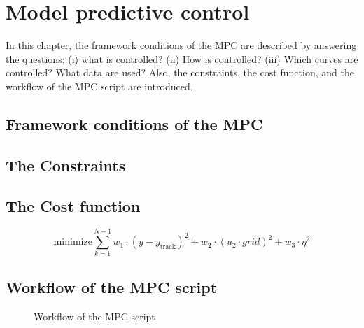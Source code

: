 \chapter{Model predictive control}
\label{ch:mpc}
In this chapter, the framework conditions of the MPC are described by answering the questions: (i) what is controlled? (ii) How is controlled? (iii) Which curves are controlled? What data are used? Also, the constraints, the cost function, and the workflow of the MPC script are introduced.  

\section{Framework conditions of the MPC}
\label{section:FrameworkMPC}

\section{The Constraints}
\label{section:theconstraints}
\section{The Cost function}
\label{section:thecostfunction}
\begin{equation}
    \text{minimize} \sum_{k=1}^{N-1} w_\text{1}\cdot (y-y_\text{track})^2 + w_\textbf{2}\cdot(u_\text{2}\cdot grid)^2 + w_\text{3} \cdot \eta^2
\end{equation}
\section{Workflow of the MPC script}
\label{section:workflowMPC}
\begin{figure}[h]
            \centering
            \def\svgwidth{0.6\textwidth}
            
            \caption{Workflow of the MPC script}
            \label{fig:workflowMPC}
    \end{figure}